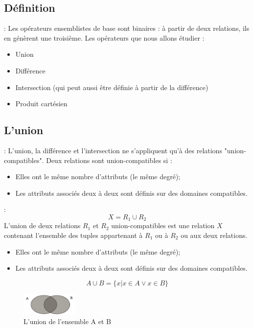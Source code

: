 \documentclass[10pt]{beamer}
\begin{document}
\subsection{Définition}
\begin{frame}{\secname : \subsecname}
    Les opérateurs ensemblistes de base sont binaires : à partir de deux relations, ils en génèrent une troisième.
    Les opérateurs que nous allons étudier :
    \begin{itemize}
        \item Union
        \item Différence
        \item Intersection (qui peut aussi être définie à partir de la différence)
        \item Produit cartésien
    \end{itemize}
\end{frame}

\subsection{L’union}
\begin{frame}{\secname : \subsecname}
    L’union, la différence et l’intersection ne s’appliquent qu’à des relations "union-compatibles".
    Deux relations sont union-compatibles si :
    \begin{itemize}
        \item Elles ont le même nombre d’attributs (le même degré);
        \item Les attributs associés deux à deux sont définis sur des domaines compatibles.
    \end{itemize}
\end{frame}

\begin{frame}{\secname : \subsecname}
    $$
        X = R_1 \cup R_2
    $$
    L’union de deux relations $R_1$ et $R_2$ union-compatibles est une relation $X$ contenant l’ensemble des tuples appartenant à $R_1$ ou à $R_2$ ou aux deux relations.
    \begin{itemize}
        \item Elles ont le même nombre d’attributs (le même degré);
        \item Les attributs associés deux à deux sont définis sur des domaines compatibles.
    \end{itemize}
    $$
        A \cup B = \{ x | x \in A \lor x \in B \}
    $$
    \begin{figure}
        \begin{center}
            \includegraphics[width=0.25\textwidth]{../assets/img/union.pdf}
            \caption*{L’union de l’ensemble A et B}
            \label{Fig:union}
        \end{center}
    \end{figure}
\end{frame}
\end{document}
